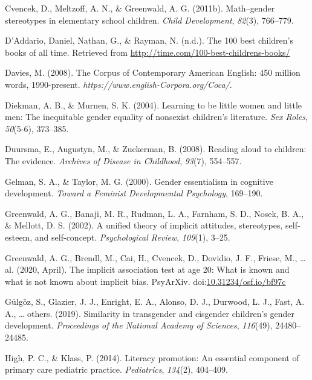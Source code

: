 \documentclass[
  english,
  ,man,floatsintext]{apa6}
\begin{document}
\leavevmode\hypertarget{ref-cvencek2011math}{}%
Cvencek, D., Meltzoff, A. N., \& Greenwald, A. G. (2011b). Math--gender stereotypes in elementary school children. \emph{Child Development}, \emph{82}(3), 766--779.

\leavevmode\hypertarget{ref-time_100_kidbooks}{}%
D'Addario, Daniel, Nathan, G., \& Rayman, N. (n.d.). The 100 best children's books of all time. Retrieved from \url{http://time.com/100-best-childrens-books/}

\leavevmode\hypertarget{ref-davies2008corpus}{}%
Davies, M. (2008). The Corpus of Contemporary American English: 450 million words, 1990-present. \emph{https://www.english-Corpora.org/Coca/}.

\leavevmode\hypertarget{ref-diekman2004learning}{}%
Diekman, A. B., \& Murnen, S. K. (2004). Learning to be little women and little men: The inequitable gender equality of nonsexist children's literature. \emph{Sex Roles}, \emph{50}(5-6), 373--385.

\leavevmode\hypertarget{ref-duursma2008reading}{}%
Duursma, E., Augustyn, M., \& Zuckerman, B. (2008). Reading aloud to children: The evidence. \emph{Archives of Disease in Childhood}, \emph{93}(7), 554--557.

\leavevmode\hypertarget{ref-gelman2000gender}{}%
Gelman, S. A., \& Taylor, M. G. (2000). Gender essentialism in cognitive development. \emph{Toward a Feminist Developmental Psychology}, 169--190.

\leavevmode\hypertarget{ref-greenwald2002unified}{}%
Greenwald, A. G., Banaji, M. R., Rudman, L. A., Farnham, S. D., Nosek, B. A., \& Mellott, D. S. (2002). A unified theory of implicit attitudes, stereotypes, self-esteem, and self-concept. \emph{Psychological Review}, \emph{109}(1), 3--25.

\leavevmode\hypertarget{ref-greenwald2020}{}%
Greenwald, A. G., Brendl, M., Cai, H., Cvencek, D., Dovidio, J. F., Friese, M., \ldots{} al. (2020, April). The implicit association test at age 20: What is known and what is not known about implicit bias. PsyArXiv. doi:\href{https://doi.org/10.31234/osf.io/bf97c}{10.31234/osf.io/bf97c}

\leavevmode\hypertarget{ref-gulgoz2019similarity}{}%
Gülgöz, S., Glazier, J. J., Enright, E. A., Alonso, D. J., Durwood, L. J., Fast, A. A., \ldots{} others. (2019). Similarity in transgender and cisgender children's gender development. \emph{Proceedings of the National Academy of Sciences}, \emph{116}(49), 24480--24485.

\leavevmode\hypertarget{ref-high2014literacy}{}%
High, P. C., \& Klass, P. (2014). Literacy promotion: An essential component of primary care pediatric practice. \emph{Pediatrics}, \emph{134}(2), 404--409.
\end{document}
